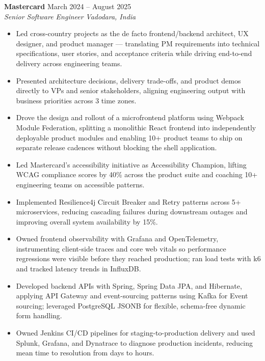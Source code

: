 \documentclass[a4paper,10pt]{article}
\newcommand{\role}[4]{
  \textbf{\color{accent}#1} \hfill {\small #2}\\
  \textit{#3} \hfill {\small \textit{#4}}
}
\begin{document}
\role{Mastercard}{March 2024 -- August 2025}{Senior Software Engineer}{Vadodara, India}
\begin{itemize}
  \item Led cross-country projects as the de facto frontend/backend architect, UX designer, and product manager --- translating PM requirements into technical specifications, user stories, and acceptance criteria while driving end-to-end delivery across engineering teams.
  \item Presented architecture decisions, delivery trade-offs, and product demos directly to VPs and senior stakeholders, aligning engineering output with business priorities across 3 time zones.
  \item Drove the design and rollout of a microfrontend platform using Webpack Module Federation, splitting a monolithic React frontend into independently deployable product modules and enabling 10+ product teams to ship on separate release cadences without blocking the shell application.
  \item Led Mastercard's accessibility initiative as Accessibility Champion, lifting WCAG compliance scores by 40\% across the product suite and coaching 10+ engineering teams on accessible patterns.
  \item Implemented Resilience4j Circuit Breaker and Retry patterns across 5+ microservices, reducing cascading failures during downstream outages and improving overall system availability by 15\%.
  \item Owned frontend observability with Grafana and OpenTelemetry, instrumenting client-side traces and core web vitals so performance regressions were visible before they reached production; ran load tests with k6 and tracked latency trends in InfluxDB.
  \item Developed backend APIs with Spring, Spring Data JPA, and Hibernate, applying API Gateway and event-sourcing patterns using Kafka for Event sourcing; leveraged PostgreSQL JSONB for flexible, schema-free dynamic form handling.
  \item Owned Jenkins CI/CD pipelines for staging-to-production delivery and used Splunk, Grafana, and Dynatrace to diagnose production incidents, reducing mean time to resolution from days to hours.
\end{itemize}
\end{document}
